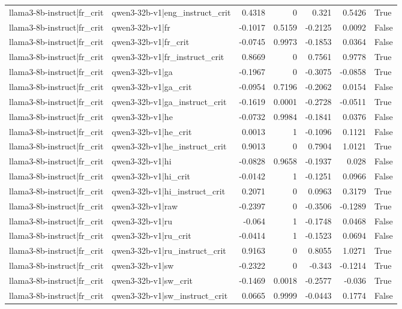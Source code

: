 \begin{table}
\begin{tabular}{l l r r r r l}
llama3-8b-instruct|fr_crit & qwen3-32b-v1|eng_instruct_crit & 0.4318 & 0 & 0.321 & 0.5426 & True \\
llama3-8b-instruct|fr_crit & qwen3-32b-v1|fr & -0.1017 & 0.5159 & -0.2125 & 0.0092 & False \\
llama3-8b-instruct|fr_crit & qwen3-32b-v1|fr_crit & -0.0745 & 0.9973 & -0.1853 & 0.0364 & False \\
llama3-8b-instruct|fr_crit & qwen3-32b-v1|fr_instruct_crit & 0.8669 & 0 & 0.7561 & 0.9778 & True \\
llama3-8b-instruct|fr_crit & qwen3-32b-v1|ga & -0.1967 & 0 & -0.3075 & -0.0858 & True \\
llama3-8b-instruct|fr_crit & qwen3-32b-v1|ga_crit & -0.0954 & 0.7196 & -0.2062 & 0.0154 & False \\
llama3-8b-instruct|fr_crit & qwen3-32b-v1|ga_instruct_crit & -0.1619 & 0.0001 & -0.2728 & -0.0511 & True \\
llama3-8b-instruct|fr_crit & qwen3-32b-v1|he & -0.0732 & 0.9984 & -0.1841 & 0.0376 & False \\
llama3-8b-instruct|fr_crit & qwen3-32b-v1|he_crit & 0.0013 & 1 & -0.1096 & 0.1121 & False \\
llama3-8b-instruct|fr_crit & qwen3-32b-v1|he_instruct_crit & 0.9013 & 0 & 0.7904 & 1.0121 & True \\
llama3-8b-instruct|fr_crit & qwen3-32b-v1|hi & -0.0828 & 0.9658 & -0.1937 & 0.028 & False \\
llama3-8b-instruct|fr_crit & qwen3-32b-v1|hi_crit & -0.0142 & 1 & -0.1251 & 0.0966 & False \\
llama3-8b-instruct|fr_crit & qwen3-32b-v1|hi_instruct_crit & 0.2071 & 0 & 0.0963 & 0.3179 & True \\
llama3-8b-instruct|fr_crit & qwen3-32b-v1|raw & -0.2397 & 0 & -0.3506 & -0.1289 & True \\
llama3-8b-instruct|fr_crit & qwen3-32b-v1|ru & -0.064 & 1 & -0.1748 & 0.0468 & False \\
llama3-8b-instruct|fr_crit & qwen3-32b-v1|ru_crit & -0.0414 & 1 & -0.1523 & 0.0694 & False \\
llama3-8b-instruct|fr_crit & qwen3-32b-v1|ru_instruct_crit & 0.9163 & 0 & 0.8055 & 1.0271 & True \\
llama3-8b-instruct|fr_crit & qwen3-32b-v1|sw & -0.2322 & 0 & -0.343 & -0.1214 & True \\
llama3-8b-instruct|fr_crit & qwen3-32b-v1|sw_crit & -0.1469 & 0.0018 & -0.2577 & -0.036 & True \\
llama3-8b-instruct|fr_crit & qwen3-32b-v1|sw_instruct_crit & 0.0665 & 0.9999 & -0.0443 & 0.1774 & False \\

\end{tabular}
\end{table}
